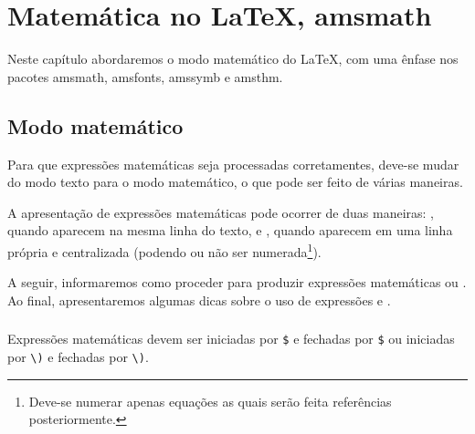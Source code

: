 % 
% 
% 
% 
% 
% 
%
%
\chapter{Matem\'{a}tica no \LaTeX, amsmath} \label{sch:math}
Neste capítulo abordaremos o modo matemático do LaTeX, com uma \^{e}nfase nos pacotes amsmath, amsfonts, amssymb e amsthm.

\section{Modo matemático}
Para que expressões matemáticas seja processadas corretamentes, deve-se mudar do modo texto para o modo matemático, o que pode ser feito de várias maneiras.

A apresentação de expressões matemáticas pode ocorrer de duas maneiras: , quando aparecem na mesma linha do texto, e , quando aparecem em uma linha própria e centralizada (podendo ou n\~{a}o ser numerada\footnote{Deve-se numerar apenas equa\c{c}\~{o}es as quais ser\~{a}o feita refer\^{e}ncias posteriormente.}).

A seguir, informaremos como proceder para produzir expressões matemáticas  ou . Ao final, apresentaremos algumas dicas sobre o uso de express\~{o}es  e .

\subsection{}
Expressões matemáticas  devem ser iniciadas por \lstinline!$! e fechadas por \lstinline!$! ou iniciadas por \lstinline!\)! e fechadas por \lstinline!\)!. \\

